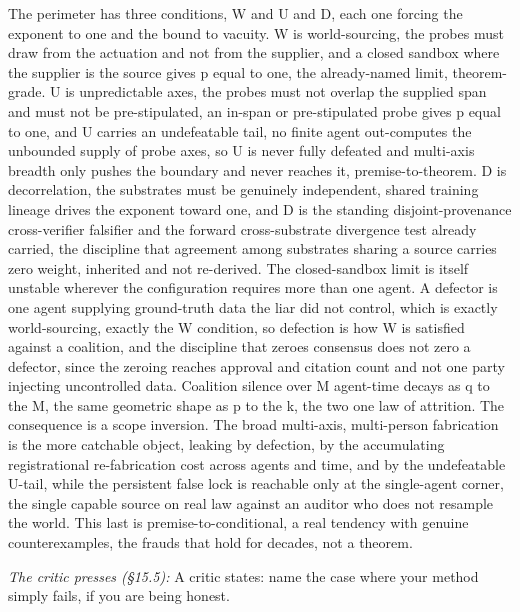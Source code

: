 \documentclass[10pt,twocolumn]{article}
\begin{document}
The perimeter has three conditions, W and U and D, each one forcing the
exponent to one and the bound to vacuity. W is world-sourcing, the
probes must draw from the actuation and not from the supplier, and a
closed sandbox where the supplier is the source gives p equal to one,
the already-named limit, theorem-grade. U is unpredictable axes, the
probes must not overlap the supplied span and must not be
pre-stipulated, an in-span or pre-stipulated probe gives p equal to one,
and U carries an undefeatable tail, no finite agent out-computes the
unbounded supply of probe axes, so U is never fully defeated and
multi-axis breadth only pushes the boundary and never reaches it,
premise-to-theorem. D is decorrelation, the substrates must be genuinely
independent, shared training lineage drives the exponent toward one, and
D is the standing disjoint-provenance cross-verifier falsifier and the
forward cross-substrate divergence test already carried, the discipline
that agreement among substrates sharing a source carries zero weight,
inherited and not re-derived. The closed-sandbox limit is itself
unstable wherever the configuration requires more than one agent. A
defector is one agent supplying ground-truth data the liar did not
control, which is exactly world-sourcing, exactly the W condition, so
defection is how W is satisfied against a coalition, and the discipline
that zeroes consensus does not zero a defector, since the zeroing
reaches approval and citation count and not one party injecting
uncontrolled data. Coalition silence over M agent-time decays as q to
the M, the same geometric shape as p to the k, the two one law of
attrition. The consequence is a scope inversion. The broad multi-axis,
multi-person fabrication is the more catchable object, leaking by
defection, by the accumulating registrational re-fabrication cost across
agents and time, and by the undefeatable U-tail, while the persistent
false lock is reachable only at the single-agent corner, the single
capable source on real law against an auditor who does not resample the
world. This last is premise-to-conditional, a real tendency with genuine
counterexamples, the frauds that hold for decades, not a theorem.

\emph{The critic presses (§15.5):} A critic states: name the case where
your method simply fails, if you are being honest.
\end{document}
